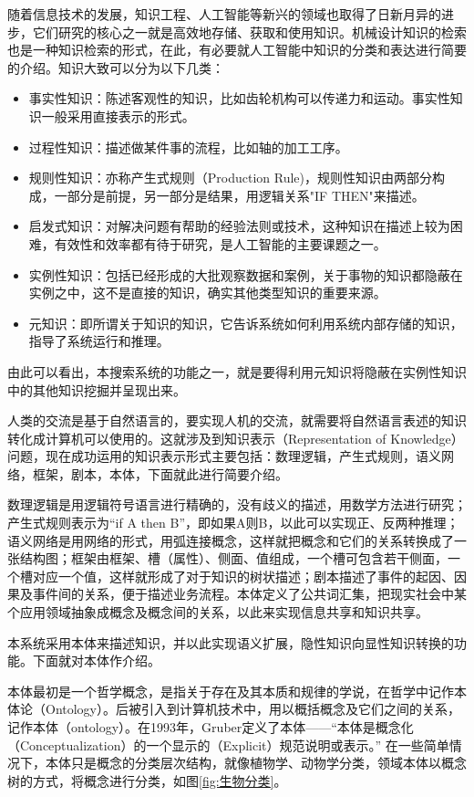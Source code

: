 \documentclass[12pt,a4paper]{article}
\begin{document}
	随着信息技术的发展，知识工程、人工智能等新兴的领域也取得了日新月异的进步，它们研究的核心之一就是高效地存储、获取和使用知识。机械设计知识的检索也是一种知识检索的形式，在此，有必要就人工智能中知识的分类和表达进行简要的介绍。知识大致可以分为以下几类：
	\begin{itemize}
		\item
	事实性知识：陈述客观性的知识，比如齿轮机构可以传递力和运动。事实性知识一般采用直接表示的形式。
		\item
	过程性知识：描述做某件事的流程，比如轴的加工工序。
		\item
	规则性知识：亦称产生式规则（Production Rule)，规则性知识由两部分构成，一部分是前提，另一部分是结果，用逻辑关系"IF THEN"来描述。
		\item
	启发式知识：对解决问题有帮助的经验法则或技术，这种知识在描述上较为困难，有效性和效率都有待于研究，是人工智能的主要课题之一。
		\item
	实例性知识：包括已经形成的大批观察数据和案例，关于事物的知识都隐蔽在实例之中，这不是直接的知识，确实其他类型知识的重要来源。
		\item
	元知识：即所谓关于知识的知识，它告诉系统如何利用系统内部存储的知识，指导了系统运行和推理。
	\end{itemize}
	
	由此可以看出，本搜索系统的功能之一，就是要得利用元知识将隐蔽在实例性知识中的其他知识挖掘并呈现出来。
	
	人类的交流是基于自然语言的，要实现人机的交流，就需要将自然语言表述的知识转化成计算机可以使用的。这就涉及到知识表示（Representation of Knowledge）问题，现在成功运用的知识表示形式主要包括：数理逻辑，产生式规则，语义网络，框架，剧本，本体，下面就此进行简要介绍。
	
	数理逻辑是用逻辑符号语言进行精确的，没有歧义的描述，用数学方法进行研究；产生式规则表示为“if A then B”，即如果A则B，以此可以实现正、反两种推理；语义网络是用网络的形式，用弧连接概念，这样就把概念和它们的关系转换成了一张结构图；框架由框架、槽（属性）、侧面、值组成，一个槽可包含若干侧面，一个槽对应一个值，这样就形成了对于知识的树状描述；剧本描述了事件的起因、因果及事件间的关系，便于描述业务流程。本体定义了公共词汇集，把现实社会中某个应用领域抽象成概念及概念间的关系，以此来实现信息共享和知识共享。 
	
	本系统采用本体来描述知识，并以此实现语义扩展，隐性知识向显性知识转换的功能。下面就对本体作介绍。
	
	本体最初是一个哲学概念，是指关于存在及其本质和规律的学说，在哲学中记作本体论（Ontology）。后被引入到计算机技术中，用以概括概念及它们之间的关系，记作本体（ontology）。在1993年，Gruber定义了本体——“本体是概念化（Conceptualization）的一个显示的（Explicit）规范说明或表示。”\cite{gruber1993} 在一些简单情况下，本体只是概念的分类层次结构，就像植物学、动物学分类，领域本体以概念树的方式，将概念进行分类，如图\ref{fig:生物分类}。
	
\end{document}
